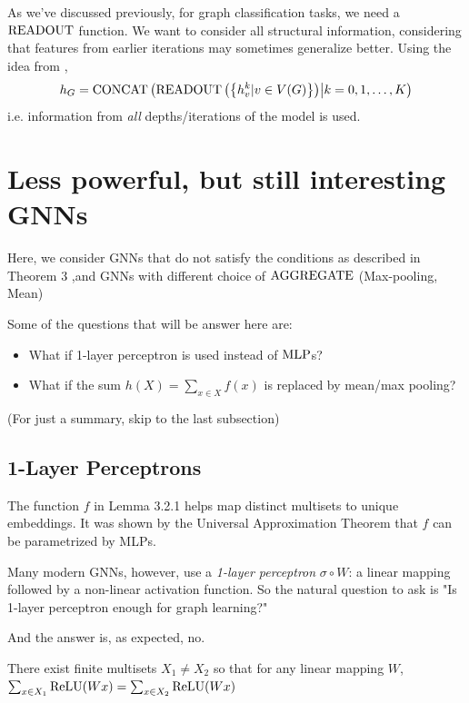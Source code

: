 As we've discussed previously, for graph classification tasks, we need a $\operatorname{READOUT}$ function.
We want to consider all structural information, considering that features from earlier iterations may sometimes generalize better. Using the idea from \cite{Xu2018}, 
	$$h_G = \operatorname{CONCAT} \left( \operatorname{READOUT} \left( \left\{ h_v^{k} | v \in V(G) \right\} \right) \middle| k = 0, 1, \dots, K \right)$$
	i.e. information from {\it all} depths/iterations of the model is used.	



\section{Less powerful, but still interesting GNNs}

Here, we consider GNNs that do not satisfy the conditions as described in Theorem 3 ,and GNNs with different choice of $\operatorname{AGGREGATE}$ (Max-pooling, Mean)

Some of the questions that will be answer here are:
\begin{itemize}
\item What if 1-layer perceptron is used instead of $\operatorname{MLP}$s?
\item What if the sum $h(X) = \sum_{x \in X} f(x)$ is replaced by mean/max pooling?
\end{itemize}

(For just a summary, skip to the last subsection)

\subsection{1-Layer Perceptrons}


The function $f$ in Lemma 3.2.1 helps map distinct multisets to unique embeddings. It was shown by the Universal Approximation Theorem\cite{Hornik1991} that $f$ can be parametrized by MLPs.

Many modern GNNs, however, use a {\it 1-layer perceptron} $\sigma \circ W$: a linear mapping followed by a non-linear activation function.
So the natural question to ask is "Is 1-layer perceptron enough for graph learning?"

And the answer is, as expected, no.

\begin{lemma}
There exist finite multisets $X_1 \not= X_2$ so that for any linear mapping $W$, $\sum_{x \in X_1} \operatorname{ReLU}(Wx) = \sum_{x \in X_2} \operatorname{ReLU}(Wx)$
\end{lemma}

